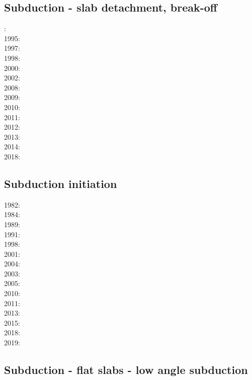\subsection*{Subduction - slab detachment, break-off}

: \cite{wosp92}\\
1995: \cite{yowo95}\\
1997: \cite{wowo97}\\
1998: \cite{desw98}\cite{caws98}\\
2000: \cite{wosp00}\\
2002: \cite{bugw02}\\
2008: \cite{zlfd08}\\
2009: \cite{anbi09}\cite{bubi09}\\
2010: \cite{bubi10}\\
2011: \cite{dugm11}\\
2012: \cite{dugk12}\cite{dusg12}\\
2013: \cite{care13}\\
2014: \cite{dugs14}\cite{besr14}\\
2018: \cite{garm18}

\subsection*{Subduction initiation}

1982: \cite{clwv82}\\
1984: \cite{cade84}\\
1989: \cite{clwv89}\\
1991: \cite{muph91}\\
1998: \cite{togu98}\\
2001: \cite{dohe01}\cite{reyb01}\cite{brry01}\\
2004: \cite{ster04}\\
2003: \cite{hags03}\\
2005: \cite{bihi05}\\
2010: \cite{nigm10}\cite{bucl10}\\
2011: \cite{bagw11}\\
2013: \cite{dyge13}\\
2015: \cite{matv15}\\
2018: \cite{zhlg18}\\
2019: \cite{begb19}

\subsection*{Subduction - flat slabs - low angle subduction}

